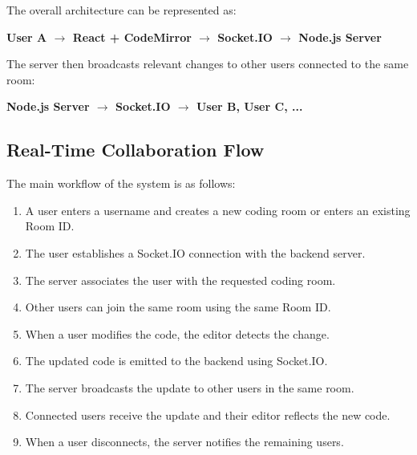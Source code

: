 \documentclass[11pt,letterpaper]{article}
\begin{document}
The overall architecture can be represented as:

\begin{center}
\textbf{
User A $\rightarrow$
React + CodeMirror $\rightarrow$
Socket.IO $\rightarrow$
Node.js Server
}
\end{center}

The server then broadcasts relevant changes to other users connected to the same room:

\begin{center}
\textbf{
Node.js Server $\rightarrow$
Socket.IO $\rightarrow$
User B, User C, ...
}
\end{center}


\subsection{Real-Time Collaboration Flow}

The main workflow of the system is as follows:

\begin{enumerate}
    \item A user enters a username and creates a new coding room or enters an existing Room ID.
    
    \item The user establishes a Socket.IO connection with the backend server.
    
    \item The server associates the user with the requested coding room.
    
    \item Other users can join the same room using the same Room ID.
    
    \item When a user modifies the code, the editor detects the change.
    
    \item The updated code is emitted to the backend using Socket.IO.
    
    \item The server broadcasts the update to other users in the same room.
    
    \item Connected users receive the update and their editor reflects the new code.
    
    \item When a user disconnects, the server notifies the remaining users.
\end{enumerate}
\end{document}
